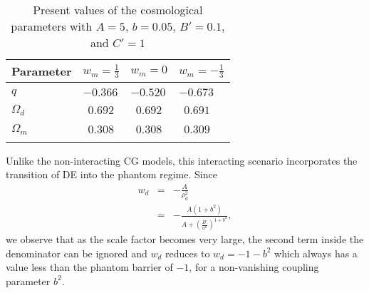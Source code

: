 \documentclass[two-column, nofootinbib]{revtex4-1}
\begin{document}

\begin{table}[h] 
\caption{Present values of the cosmological parameters with $A=5$, $b=0.05$, $B'=0.1$, and $C'=1$}
\begin{center}
\begin{tabular}{p{2cm}p{1.75cm}p{1.75cm}p{1.75cm}}
\hline \hline Parameter & $w_m=\frac{1}{3}$ & $w_m=0$ & $w_m=-\frac{1}{3}$ \\
\hline \\ $q$ & $-0.366$ & $-0.520$ & $-0.673$ \\\\
 	   $\Omega_d$ & $~~0.692$ & $~~0.692$ & $~~0.691$ \\\\
 	   $\Omega_m$ & $~~0.308$ & $~~0.308$ & $~~0.309$ \\\\
\hline \hline
\end{tabular}
\end{center}
\label{Tab:1}
\end{table}

Unlike the non-interacting CG models, this interacting scenario incorporates the transition of DE into the phantom regime. Since
\begin{eqnarray}
w_d &=& -\frac{A}{\rho _{d}^{2}} \nonumber \\
&=& -\frac{A(1+b^2)}{A+\left(\frac{B'}{a^6}\right)^{1+b^2 }},
\end{eqnarray}
we observe that as the scale factor becomes very large, the second term inside the denominator can be ignored and $w_d$ reduces to $w_d=-1-b^2$ which always has a value less than the phantom barrier of $-1$, for a non-vanishing coupling parameter $b^2$.\\
\end{document}
